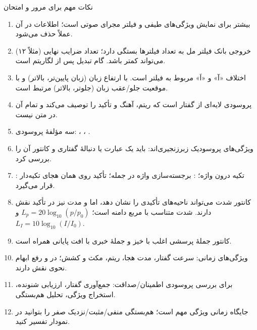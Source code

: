 \begin{exambox}{نکات مهم برای مرور و امتحان}
\begin{enumerate}
  \item {} بیشتر برای نمایش ویژگی‌های طیفی و فیلتر مجرای صوتی است؛ اطلاعات  در آن عملاً حذف می‌شود.
  \item خروجی بانک فیلتر مل به تعداد فیلترها بستگی دارد؛ تعداد ضرایب نهایی (مثلاً ۱۲) می‌تواند کمتر باشد. گام تبدیل پس از لگاریتم  است.
  \item اختلاف «آ» و «اَ» مربوط به فیلتر است.  با ارتفاع زبان (زبان پایین‌تر،  بالاتر) و  با موقعیت جلو/عقب زبان (جلوتر،  بالاتر) مرتبط است.
  \item پروسودی لایه‌ای از گفتار است که ریتم، آهنگ و تأکید را توصیف می‌کند و تمام آن در متن نیست.
  \item سه مؤلفهٔ پروسودی: ، ، .
  \item ویژگی‌های پروسودیک زبرزنجیری‌اند: باید یک عبارت یا دنبالهٔ گفتاری و کانتور آن را بررسی کرد.
  \item {}: تکیه درون واژه؛ : برجسته‌سازی واژه در جمله؛ تأکید روی همان هجای تکیه‌دار قرار می‌گیرد.
  \item کانتور شدت می‌تواند ناحیه‌های تأکیدی را نشان دهد، اما  و مدت نیز در تأکید نقش دارند. شدت متناسب با مربع دامنه است؛ $L_p=20\log_{10}(p/p_0)$ و $L_I=10\log_{10}(I/I_0)$.
  \item کانتور جملهٔ پرسشی اغلب با خیز و جملهٔ خبری با افت پایانی همراه است.
  \item ویژگی‌های زمانی: سرعت گفتار، مدت هجا، ریتم، مکث و کشش؛ در  و رفع ابهام نحوی نقش دارند.
  \item برای بررسی پروسودی اطمینان/صداقت: جمع‌آوری گفتار، ارزیابی شنونده، استخراج ویژگی، تحلیل هم‌بستگی.
  \item جایگاه زمانی ویژگی مهم است؛ هم‌بستگی منفی/مثبت/نزدیک صفر را بتوانید در نمودار تفسیر کنید.
\end{enumerate}
\end{exambox}
